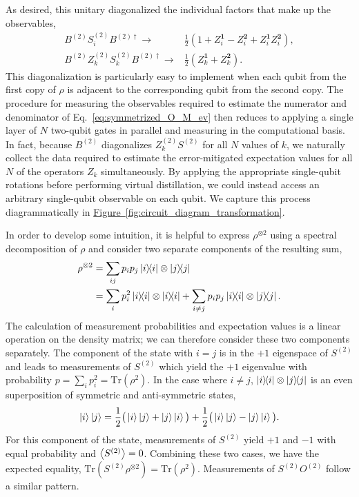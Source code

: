 \documentclass[
amsmath,
amssymb,
aps,
pra,
reprint,
twocolumn,
superscriptaddress,
longbibliography,
showkeys,
floatfix
]{revtex4-1}
\def\ket#1{\ensuremath{\mathinner{|{#1}\rangle}}}
\def\tr{\mathrm{Tr}}
\newcommand{\eq}[1]{Eq.~\hyperref[eq:#1]{\ref*{eq:#1}}}
\newcommand{\fig}[1]{\hyperref[fig:#1]{Figure~\ref*{fig:#1}}}
\begin{document}
As desired, this unitary diagonalized the individual factors that make up the
observables,
\begin{align}
  B^{(2)} S^{(2)}_i B^{(2) \dagger} \rightarrow& \frac{1}{2}(1 + Z_i^\textbf{1} - Z_i^\textbf{2} + Z_i^\textbf{1}Z_i^\textbf{2}), \\
  B^{(2)} Z^{(2)}_k S^{(2)}_k B^{(2) \dagger} \rightarrow& \frac{1}{2}(Z_k^\textbf{1} + Z_k^\textbf{2}).
\end{align}
This diagonalization is particularly easy to implement when each qubit from the
first copy of \(\rho\) is adjacent to the corresponding qubit from the second
copy. 
The procedure for measuring the observables required to estimate the numerator
and denominator of \eq{symmetrized_O_M_ev} then reduces to applying a single
layer of \(N\) two-qubit gates in parallel and measuring in the computational
basis. 
In fact, because \(B^{(2)}\) diagonalizes \(Z^{(2)}_k S^{(2)}\) for all \(N\)
values of \(k\), we naturally collect the data required to estimate the
error-mitigated expectation values for all \(N\) of the operators \(Z_k\)
simultaneously. By applying the appropriate single-qubit rotations before performing virtual distillation, we could instead access an arbitrary single-qubit observable on each qubit.
We capture this process diagrammatically in
\fig{circuit_diagram_transformation}.


In order to develop some intuition, it is helpful to express
\(\rho^{\otimes 2}\) using a spectral decomposition of \(\rho\) and consider two
separate components of the resulting sum,
\begin{align}
  \rho^{\otimes 2} &= \sum_{ij} p_i p_j \ketbra{i}\otimes\ketbra{j} \\
                   &=
                     \sum_{i} p_i^2 \ketbra{i} \otimes \ketbra{i} + \sum_{i \neq j} p_i p_j \ketbra{i} \otimes \ketbra{j}.
                     \nonumber
\end{align}
The calculation of measurement probabilities and expectation values is a linear
operation on the density matrix; we can therefore consider these two components
separately.
The component of the state with \(i=j\) is in the \(+1\) eigenspace of
\(S^{(2)}\) and leads to measurements of \(S^{(2)}\) which yield the \(+1\)
eigenvalue with probability \(p = \sum_{i} p_i^2 = \tr(\rho^2)\). 
In the case where \(i \neq j\), \(\ketbra{i}\otimes\ketbra{j}\) is an even
superposition of symmetric and anti-symmetric states,
\begin{equation}
  \ket{i}\ket{j} = 
  \frac{1}{2}
  \big(\ket{i}\ket{j} + \ket{j}\ket{i}\big) +
  \frac{1}{2}
  \big(\ket{i}\ket{j} - \ket{j}\ket{i}\big).
\end{equation}
For this component of the state, measurements of \(S^{(2)}\) yield \(+1\) and
\(-1\) with equal probability and \(\ev{S^{(2)}} = 0\). 
Combining these two cases, we have the expected equality, \(\tr(S^{(2)}
\rho^{\otimes 2}) = \tr(\rho^2)\). 
Measurements of \(S^{(2)}O^{(2)}\) follow a similar pattern.
\end{document}
